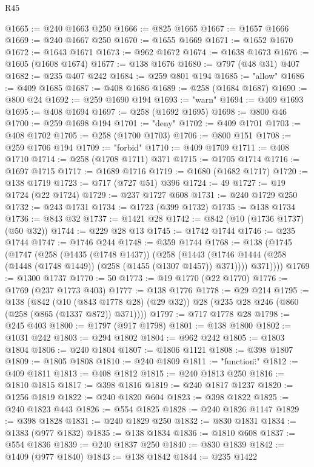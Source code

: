 \begin{lexlean}{R45}
\begin{coremodule}
@1665 := @240 @1663 @250
@1666 := @825 @1665
@1667 := @1657 @1666
@1669 := @240 @1667 @250
@1670 := @1655 @1669
@1671 := @1652 @1670
@1672 := @1643 @1671
@1673 := @962 @1672
@1674 := @1638 @1673
@1676 := @1605 (@1608 @1674)
@1677 := @138 @1676
@1680 := @797 (@48 @31) @407
@1682 := @235 @407 @242
@1684 := @259 @801 @194
@1685 := "allow"
@1686 := @409 @1685
@1687 := @408 @1686
@1689 := @258 (@1684 @1687)
@1690 := @800 @24
@1692 := @259 @1690 @194
@1693 := "warn"
@1694 := @409 @1693
@1695 := @408 @1694
@1697 := @258 (@1692 @1695)
@1698 := @800 @46
@1700 := @259 @1698 @194
@1701 := "deny"
@1702 := @409 @1701
@1703 := @408 @1702
@1705 := @258 (@1700 @1703)
@1706 := @800 @151
@1708 := @259 @1706 @194
@1709 := "forbid"
@1710 := @409 @1709
@1711 := @408 @1710
@1714 := @258 (@1708 @1711) @371
@1715 := @1705 @1714
@1716 := @1697 @1715
@1717 := @1689 @1716
@1719 := @1680 (@1682 @1717)
@1720 := @138 @1719
@1723 := @717 (@727 @51) @396
@1724 := 49
@1727 := @19 @1724 (@22 @1724)
@1729 := @237 @1727 @608
@1731 := @240 @1729 @250
@1732 := @243 @1731
@1734 := @1723 (@399 @1732)
@1735 := @138 @1734
@1736 := @843 @32
@1737 := @1421 @28
@1742 := @842 (@10 (@1736 @1737) (@50 @32))
@1744 := @229 @28 @13
@1745 := @1742 @1744
@1746 := @235 @1744
@1747 := @1746 @244
@1748 := @359 @1744
@1768 := @138
    (@1745
      (@1747
        (@258
          (@1435 (@1748 @1437))
          (@258
            (@1443 (@1746 @1444 (@258 (@1448 (@1748 @1449)) (@258 (@1455 (@1307 @1457)) @371))))
            @371))))
@1769 := @1300 @1737
@1770 := 50
@1773 := @19 @1770 (@22 @1770)
@1776 := @1769 (@237 @1773 @403)
@1777 := @138 @1776
@1778 := @29 @214
@1795 := @138
    (@842
      (@10 (@843 @1778 @28) (@29 @32))
      @28
      (@235 @28 @246 (@860 (@258 (@865 (@1337 @872)) @371))))
@1797 := @717 @1778 @28
@1798 := @245 @403
@1800 := @1797 (@917 @1798)
@1801 := @138 @1800
@1802 := @1031 @242
@1803 := @294 @1802
@1804 := @962 @242
@1805 := @1803 @1804
@1806 := @240 @1804
@1807 := @1806 @1121
@1808 := @398 @1807
@1809 := @1805 @1808
@1810 := @240 @1809
@1811 := "{\"function\":"
@1812 := @409 @1811
@1813 := @408 @1812
@1815 := @240 @1813 @250
@1816 := @1810 @1815
@1817 := @398 @1816
@1819 := @240 @1817 @1237
@1820 := @1256 @1819
@1822 := @240 @1820 @604
@1823 := @398 @1822
@1825 := @240 @1823 @443
@1826 := @554 @1825
@1828 := @240 @1826 @1147
@1829 := @398 @1828
@1831 := @240 @1829 @250
@1832 := @830 @1831
@1834 := @1383 (@977 @1832)
@1835 := @138 @1834
@1836 := @1810 @608
@1837 := @554 @1836
@1839 := @240 @1837 @250
@1840 := @830 @1839
@1842 := @1409 (@977 @1840)
@1843 := @138 @1842
@1844 := @235 @1422
}
\end{coremodule}
\end{lexlean}

